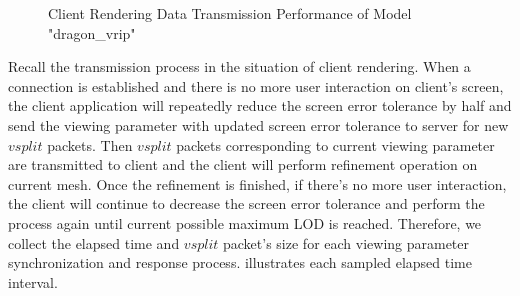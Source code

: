 \begin{figure}
\centering
{}
\label{fig:dragon_vrip_trans_perf}
\caption{Client Rendering Data Transmission Performance of Model "dragon\_vrip"}
\end{figure}


Recall the transmission process in the situation of client rendering. When a connection is established and there is no more user interaction on client's screen, the client application will repeatedly reduce the screen error tolerance by half and send the viewing  parameter with updated screen error tolerance to server for new $vsplit$ packets. Then $vsplit$ packets corresponding to current viewing parameter are transmitted to client and the client will perform refinement operation on current mesh. Once the refinement is finished, if there's no more user interaction,  the client will continue to decrease the screen error tolerance and perform the process again until current possible maximum LOD is reached. Therefore, we collect the elapsed time and $vsplit$ packet's size for each viewing parameter synchronization and response process.  illustrates each sampled elapsed time interval. \\

